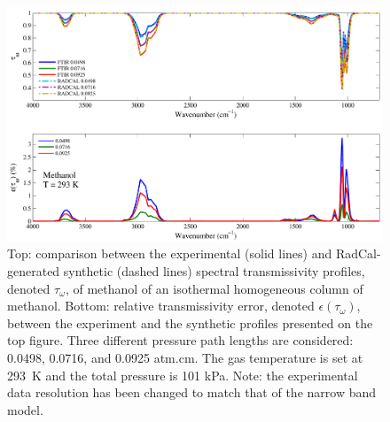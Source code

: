 \begin{figure}[h]
\includegraphics[width=\textwidth]{../Verification/Results_Test2/Methanol_293.pdf}
\caption{Top: comparison between the experimental (solid lines) and RadCal-generated synthetic (dashed lines) spectral transmissivity profiles, denoted $\tau_{\omega}$, of methanol of an isothermal homogeneous column of methanol. Bottom: relative transmissivity error, denoted $\epsilon{(\tau_{\omega})}$, between the experiment and the synthetic profiles presented on the top figure. Three different pressure path lengths are considered: 0.0498, 0.0716, and 0.0925 atm.cm. The gas temperature is set at 293~K and the total pressure is 101 kPa. Note: the experimental data resolution has been changed to match that of the narrow band model. \label{fig:methanol_Verify_293K}}
\end{figure}

\newpage


